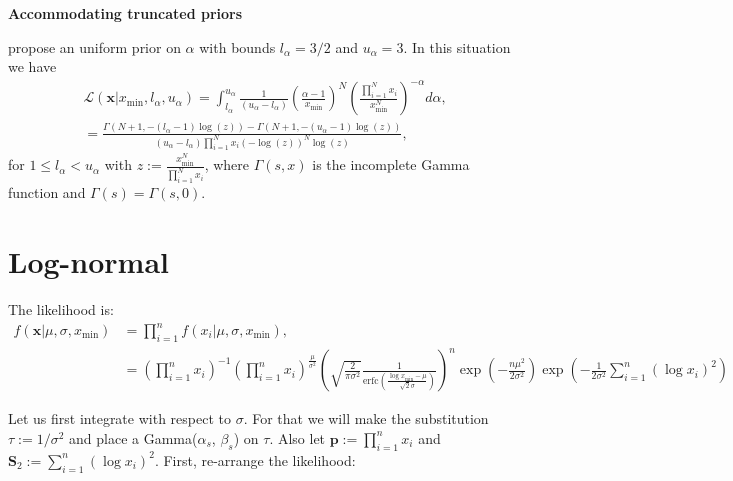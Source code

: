 \documentclass[a4paper, notitlepage, 10pt]{article}
\begin{document}
\textbf{Accommodating truncated priors}

\cite{Gillespie2017} propose an uniform prior on $\alpha$ with bounds $l_\alpha = 3/2$ and $u_\alpha = 3$.
In this situation we have
\begin{align} 
 \label{eq:truncated_alpha_MaL}
  & \mathcal{L}( \boldsymbol x |  x_{\min},  l_\alpha, u_\alpha) = \int_{l_\alpha}^{u_\alpha} \frac{1}{(u_\alpha - l_\alpha)} \left( \frac{\alpha - 1}{x_{\min} } \right)^N \left(\frac{ \prod_{i= 1}^N x_i}{ x_{\min}^N }\right)^{-\alpha} d\alpha, \\ %
  &= \frac{\Gamma\left(N + 1, -(l_\alpha - 1)\log(z) \right) - \Gamma\left(N + 1, - (u_\alpha - 1) \log(z) \right) }{(u_\alpha - l_\alpha)\prod_{i= 1}^N x_i\left(-\log(z)\right)^N \log(z)} , 
  \end{align}
for $ 1 \leq l_\alpha < u_\alpha$ with $z := \frac{x_{\min}^N}{\prod_{i= 1}^N x_i }$, where $\Gamma(s, x)$ is the incomplete Gamma function and $\Gamma(s) = \Gamma(s, 0)$.
\section{Log-normal}

The likelihood is:
\begin{align}
 f(\boldsymbol x | \mu, \sigma, x_{\min}) &= \prod_{i = 1}^n f(x_i | \mu, \sigma, x_{\min}), \\
 &= \left(\prod_{i = 1}^n x_i \right)^{-1} \left(\prod_{i = 1}^n x_i \right)^{\frac{\mu}{\sigma^2}} \left( \sqrt{\frac{2}{\pi\sigma^2}} \frac{1}{\text{erfc}\left( \frac{\log x_{\min} - \mu}{\sqrt{2}\sigma} \right)}\right)^n \exp\left( -\frac{n\mu^2}{2\sigma^2} \right) \exp\left(-\frac{1}{2\sigma^2}\sum_{i=1}^n (\log x_i)^2\right) 
\end{align}

Let us first integrate with respect to $\sigma$.
For that we will make the substitution $\tau := 1/\sigma^2$ and place a Gamma($\alpha_s$, $\beta_s$) on $\tau$.
Also let $ \boldsymbol p := \prod_{i = 1}^n x_i$ and $\boldsymbol S_2 := \sum_{i=1}^n (\log x_i)^2$.
First, re-arrange the likelihood:
\end{document}
